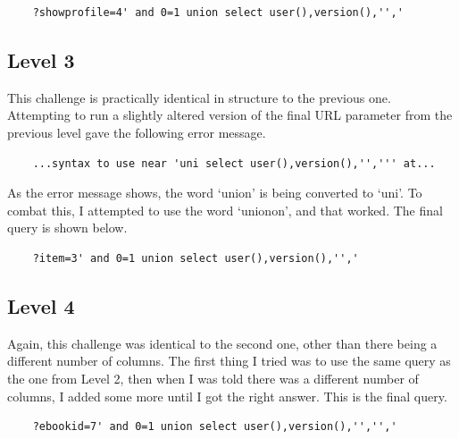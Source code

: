 \documentclass{article}
\begin{document}
\begin{verbatim}
	?showprofile=4' and 0=1 union select user(),version(),'','
\end{verbatim}

\subsection{Level 3}

This challenge is practically identical in structure to the previous one. Attempting to run a slightly altered version of the final URL parameter from the previous level gave the following error message.

\begin{verbatim}
	...syntax to use near 'uni select user(),version(),'',''' at...
\end{verbatim}

As the error message shows, the word `union' is being converted to `uni'. To combat this, I attempted to use the word `unionon', and that worked. The final query is shown below.

\begin{verbatim}
	?item=3' and 0=1 union select user(),version(),'','
\end{verbatim}

\subsection{Level 4}

Again, this challenge was identical to the second one, other than there being a different number of columns. The first thing I tried was to use the same query as the one from Level 2, then when I was told there was a different number of columns, I added some more until I got the right answer. This is the final query.

\begin{verbatim}
	?ebookid=7' and 0=1 union select user(),version(),'','','
\end{verbatim}
\end{document}
